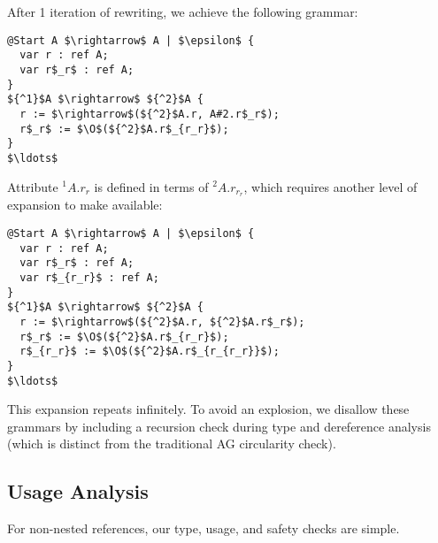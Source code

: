 After 1 iteration of rewriting, we achieve the following grammar:

\begin{lstlisting}[mathescape]
@Start A $\rightarrow$ A | $\epsilon$ { 
  var r : ref A; 
  var r$_r$ : ref A;
}
${^1}$A $\rightarrow$ ${^2}$A { 
  r := $\rightarrow$(${^2}$A.r, A#2.r$_r$);
  r$_r$ := $\O$(${^2}$A.r$_{r_r}$);
}
$\ldots$
\end{lstlisting}

Attribute ${^1}A.r_r$ is defined in terms of ${^2}A.r_{r_r}$, which requires another level of expansion to make available:

\begin{lstlisting}[mathescape]
@Start A $\rightarrow$ A | $\epsilon$ { 
  var r : ref A; 
  var r$_r$ : ref A;
  var r$_{r_r}$ : ref A;
}
${^1}$A $\rightarrow$ ${^2}$A { 
  r := $\rightarrow$(${^2}$A.r, ${^2}$A.r$_r$);
  r$_r$ := $\O$(${^2}$A.r$_{r_r}$);
  r$_{r_r}$ := $\O$(${^2}$A.r$_{r_{r_r}}$);
}
$\ldots$
\end{lstlisting}

This expansion repeats infinitely. To avoid an explosion, we disallow these grammars by including a recursion check during type and dereference analysis (which is distinct from the traditional AG circularity check).

\subsection{Usage Analysis}

For non-nested references, our type, usage, and safety checks are simple. 

